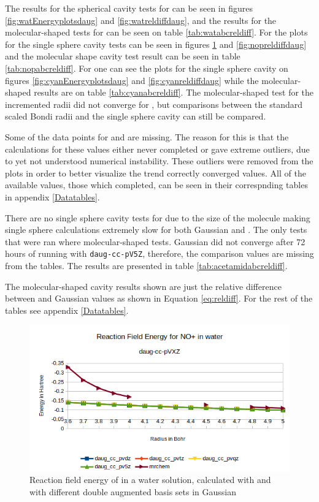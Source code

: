 \documentclass[../master_thesis.tex]{subfiles}
\begin{document}
The results for the spherical cavity tests for  can be seen in figures
\ref{fig:watEnergyplotsdaug} and \ref{fig:watreldiffdaug}, and the results for the
molecular-shaped tests for  can be seen on table \ref{tab:watabcreldiff}.
For  the plots for the single sphere cavity tests can be seen in figures
\ref{fig:nopEnergyplotsdaug} and \ref{fig:nopreldiffdaug} and the molecular
shape cavity test result can be seen in table \ref{tab:nopabcreldiff}.
For  one can see the plots for the single sphere cavity on figures
\ref{fig:cyanEnergyplotsdaug} and \ref{fig:cyanreldiffdaug} while the
molecular-shaped results are on table \ref{tab:cyanabcreldiff}. The molecular-shaped
test for the incremented radii did not converge for , but comparisons between
the standard scaled Bondi radii and the single sphere cavity can still be compared.

Some of the data points for  and  are missing. The reason for this
is that the calculations for these values either never completed or gave extreme
outliers, due to yet not understood numerical instability. These outliers were removed from the plots
in order to better visualize the trend correctly converged values.
All of the available values, those which completed, can be seen in their correspnding
tables in appendix \ref{Datatables}.

There are no single sphere cavity tests for  due to the size of the molecule
making single sphere calculations extremely slow for both Gaussian and \mrchem.
The only tests that were ran where molecular-shaped tests. Gaussian did not converge
after 72 hours of running with \verb!daug-cc-pV5Z!, therefore, the comparison values
are missing from the tables. The  results are presented in table
\ref{tab:acetamidabcreldiff}.

The molecular-shaped cavity results shown are just the relative difference between
\mrchem and Gaussian values as shown in Equation \ref{eq:reldiff}. For the rest of the
tables see appendix \ref{Datatables}.

\begin{figure}[!htb]
  \centering
    \includegraphics[width=\linewidth]{img/Erdaugnop.png}
  \caption[Energy plots for ]{Reaction field energy of  in a water solution, calculated with \mrchem
  and with different double augmented basis sets in Gaussian}
  \label{fig:nopEnergyplotsdaug}
\end{figure}
\end{document}

